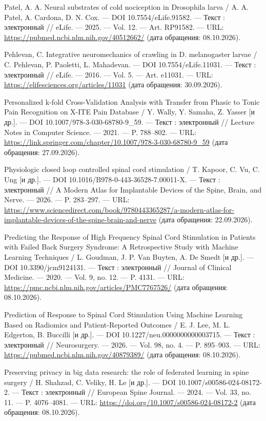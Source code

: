 \begin{list}{}{\setlength{\leftmargin}{10mm}\setlength{\labelwidth}{8mm}\setlength{\labelsep}{2mm}\setlength{\itemsep}{0pt}\setlength{\parsep}{0pt}\setlength{\topsep}{0pt}}
\item[226.] Patel, A. A. Neural substrates of cold nociception in Drosophila larva / A. A. Patel, A. Cardona, D. N. Cox. — DOI 10.7554/eLife.91582. — Текст : электронный // eLife. — 2025. — Vol. 12. — Art. RP91582. — URL: \url{https://pubmed.ncbi.nlm.nih.gov/40512662/} (дата обращения: 08.10.2026).
\item[227.] Pehlevan, C. Integrative neuromechanics of crawling in D. melanogaster larvae / C. Pehlevan, P. Paoletti, L. Mahadevan. — DOI 10.7554/eLife.11031. — Текст : электронный // eLife. — 2016. — Vol. 5. — Art. e11031. — URL: \url{https://elifesciences.org/articles/11031} (дата обращения: 30.09.2026).
\item[228.] Personalized k-fold Cross-Validation Analysis with Transfer from Phasic to Tonic Pain Recognition on X-ITE Pain Database / Y. Wally, Y. Samaha, Z. Yasser [и др.]. — DOI 10.1007/978-3-030-68780-9\_59. — Текст : электронный // Lecture Notes in Computer Science. — 2021. — P. 788–802. — URL: \url{https://link.springer.com/chapter/10.1007/978-3-030-68780-9\_59} (дата обращения: 27.09.2026).
\item[229.] Physiologic closed loop controlled spinal cord stimulation / T. Kapoor, C. Vu, C. Ung [и др.]. — DOI 10.1016/B978-0-443-36528-7.00011-X. — Текст : электронный // A Modern Atlas for Implantable Devices of the Spine, Brain, and Nerve. — 2026. — P. 283–297. — URL: \url{https://www.sciencedirect.com/book/9780443365287/a-modern-atlas-for-implantable-devices-of-the-spine-brain-and-nerve} (дата обращения: 22.09.2026).
\item[230.] Predicting the Response of High Frequency Spinal Cord Stimulation in Patients with Failed Back Surgery Syndrome: A Retrospective Study with Machine Learning Techniques / L. Goudman, J. P. Van Buyten, A. De Smedt [и др.]. — DOI 10.3390/jcm9124131. — Текст : электронный // Journal of Clinical Medicine. — 2020. — Vol. 9, no. 12. — P. 4131. — URL: \url{https://pmc.ncbi.nlm.nih.gov/articles/PMC7767526/} (дата обращения: 08.10.2026).
\item[231.] Prediction of Response to Spinal Cord Stimulation Using Machine Learning Based on Radiomics and Patient-Reported Outcomes / E. J. Lee, M. L. Edgerton, B. Buccilli [и др.]. — DOI 10.1227/neu.0000000000003715. — Текст : электронный // Neurosurgery. — 2026. — Vol. 98, no. 4. — P. 895–903. — URL: \url{https://pubmed.ncbi.nlm.nih.gov/40879389/} (дата обращения: 08.10.2026).
\item[232.] Preserving privacy in big data research: the role of federated learning in spine surgery / H. Shahzad, C. Veliky, H. Le [и др.]. — DOI 10.1007/s00586-024-08172-2. — Текст : электронный // European Spine Journal. — 2024. — Vol. 33, no. 11. — P. 4076–4081. — URL: \url{https://doi.org/10.1007/s00586-024-08172-2} (дата обращения: 08.10.2026).

\end{list}
